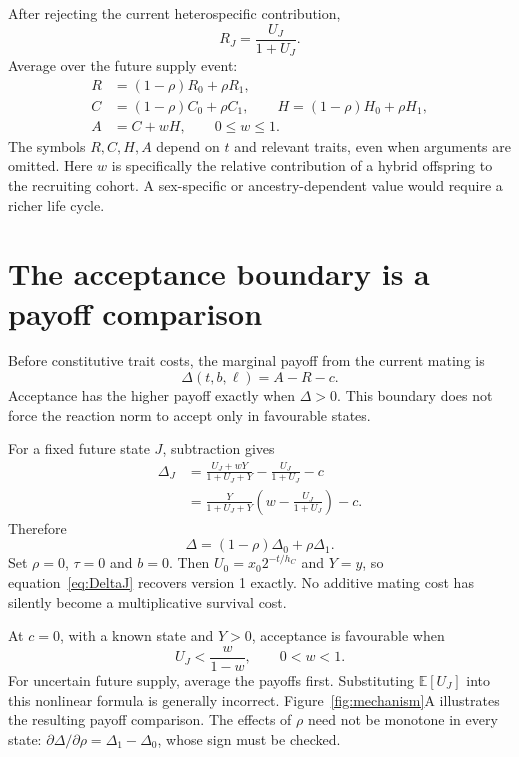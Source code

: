 \documentclass[11pt,a4paper]{article}
\newcommand{\E}{\mathbb E}
\begin{document}
After rejecting the current heterospecific contribution,
\begin{equation}
R_J=\frac{U_J}{1+U_J}.
\end{equation}
Average over the future supply event:
\begin{align}
R&=(1-\rho)R_0+\rho R_1,\\
C&=(1-\rho)C_0+\rho C_1,\qquad
H=(1-\rho)H_0+\rho H_1,\\
A&=C+wH,\qquad 0\leq w\leq1.
\end{align}
The symbols $R,C,H,A$ depend on $t$ and relevant traits, even when arguments are omitted. Here $w$ is specifically the relative contribution of a hybrid offspring to the recruiting cohort. A sex-specific or ancestry-dependent value would require a richer life cycle.

\section{The acceptance boundary is a payoff comparison}
Before constitutive trait costs, the marginal payoff from the current mating is
\begin{equation}
\boxed{\Delta(t,b,\ell)=A-R-c.}
\label{eq:Delta}
\end{equation}
Acceptance has the higher payoff exactly when $\Delta>0$. This boundary does not force the reaction norm to accept only in favourable states.

For a fixed future state $J$, subtraction gives
\begin{align}
\Delta_J
&=\frac{U_J+wY}{1+U_J+Y}-\frac{U_J}{1+U_J}-c\\
&=\frac{Y}{1+U_J+Y}
\left(w-\frac{U_J}{1+U_J}\right)-c.
\label{eq:DeltaJ}
\end{align}
Therefore
\begin{equation}
\Delta=(1-\rho)\Delta_0+\rho\Delta_1.
\end{equation}
Set $\rho=0$, $\tau=0$ and $b=0$. Then $U_0=x_0 2^{-t/h_C}$ and $Y=y$, so equation~\eqref{eq:DeltaJ} recovers version 1 exactly. No additive mating cost has silently become a multiplicative survival cost.

At $c=0$, with a known state and $Y>0$, acceptance is favourable when
\begin{equation}
U_J<\frac{w}{1-w},\qquad 0<w<1.
\end{equation}
For uncertain future supply, average the payoffs first. Substituting $\E[U_J]$ into this nonlinear formula is generally incorrect. Figure~\ref{fig:mechanism}A illustrates the resulting payoff comparison. The effects of $\rho$ need not be monotone in every state: $\partial\Delta/\partial\rho=\Delta_1-\Delta_0$, whose sign must be checked.
\end{document}
